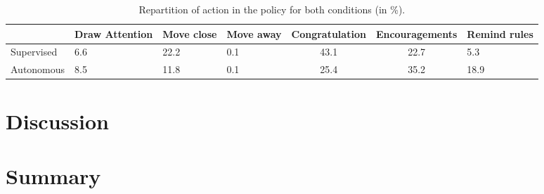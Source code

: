 \begin{table}[ht]
	\centering
	\caption{Repartition of action in the policy for both conditions (in \%).}
	\label{tab:policies}
	\begin{tabularx}{\textwidth}{l|YYYccY}
		& Draw \newline Attention & Move \newline close & Move \newline away & Congratulation & Encouragements & Remind \newline rules \\
		\hline
		Supervised & 6.6  & 22.2 & 0.1 & 43.1 & 22.7 & 5.3 \\
		Autonomous & 8.5 & 11.8 & 0.1 & 25.4 & 35.2 & 18.9\\
	\end{tabularx}
\end{table}

\section{Discussion}

\section{Summary}

